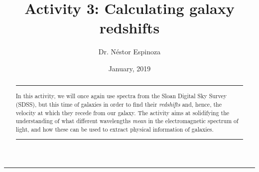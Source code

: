 \documentclass{tufte-handout}
\title{Activity 3: Calculating galaxy redshifts}
\author[Dr. N\'estor Espinoza]{Dr. N\'estor Espinoza}
\date{January, 2019}  %
\begin{document}
\noindent\textcolor{Red}{\rule{16cm}{3mm}}

{\let\newpage\relax\maketitle}

\begin{abstract}
\noindent\textcolor{Red}{\rule{10cm}{0.4mm}}
\noindent In this activity, we will once again use spectra from the Sloan Digital Sky Survey (SDSS), but this time 
of galaxies in order to find their \textit{redshifts} and, hence, the velocity at which they recede from our galaxy. 
The activity aims at solidifying the understanding of what different wavelengths \textit{mean} in the electromagnetic 
spectrum of light, and how these can be used to extract physical information of galaxies.

\noindent\textcolor{Red}{\rule{10cm}{0.4mm}}
\end{abstract}
\end{document}
